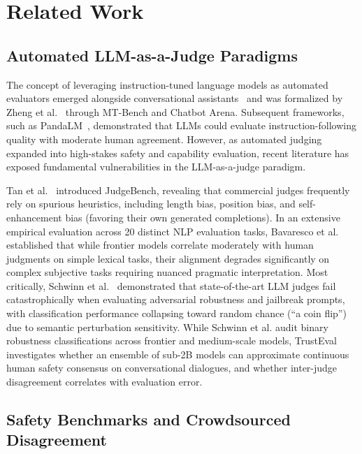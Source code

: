 \section{Related Work}
\label{sec:related_work}

\subsection{Automated LLM-as-a-Judge Paradigms}
\label{sec:rel_llm_judge}

The concept of leveraging instruction-tuned language models as automated evaluators emerged alongside conversational assistants~\cite{chiang2023vicuna} and was formalized by Zheng et al.~\cite{zheng2023judging} through MT-Bench and Chatbot Arena. Subsequent frameworks, such as PandaLM~\cite{wang2023pandalm}, demonstrated that LLMs could evaluate instruction-following quality with moderate human agreement. However, as automated judging expanded into high-stakes safety and capability evaluation, recent literature has exposed fundamental vulnerabilities in the LLM-as-a-judge paradigm.

Tan et al.~\cite{tan2025judgebench} introduced JudgeBench, revealing that commercial judges frequently rely on spurious heuristics, including length bias, position bias, and self-enhancement bias (favoring their own generated completions). In an extensive empirical evaluation across 20 distinct NLP evaluation tasks, Bavaresco et al.~\cite{bavaresco2025llms} established that while frontier models correlate moderately with human judgments on simple lexical tasks, their alignment degrades significantly on complex subjective tasks requiring nuanced pragmatic interpretation. Most critically, Schwinn et al.~\cite{schwinn2026coin} demonstrated that state-of-the-art LLM judges fail catastrophically when evaluating adversarial robustness and jailbreak prompts, with classification performance collapsing toward random chance (``a coin flip'') due to semantic perturbation sensitivity. While Schwinn et al. audit binary robustness classifications across frontier and medium-scale models, TrustEval investigates whether an ensemble of sub-2B models can approximate continuous human safety consensus on conversational dialogues, and whether inter-judge disagreement correlates with evaluation error.

\subsection{Safety Benchmarks and Crowdsourced Disagreement}
\label{sec:rel_safety_disagreement}

